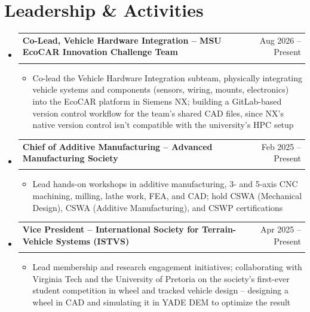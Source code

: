 \documentclass[a4paper,10pt]{article}
\makeatletter
\newcommand{\resumeItem}[1]{
  \item\small{#1 \vspace{-2pt}}
}
\newcommand{\resumeSubheading}[4]{
  \vspace{-2pt}\item
    \begin{tabular*}{0.99\textwidth}[t]{l@{\extracolsep{\fill}}r}
      \textbf{#1} & #2 \\
      \textit{\small#3} & \textit{\small #4} \\
    \end{tabular*}\vspace{-7pt}
}
\newcommand{\resumeSubHeadingListStart}{\begin{itemize}[leftmargin=0.0in, label={}]}
\newcommand{\resumeSubHeadingListEnd}{\end{itemize}}
\newcommand{\resumeItemListStart}{\begin{itemize}[leftmargin=0.15in, label=\textbullet]}
\newcommand{\resumeItemListEnd}{\end{itemize}\vspace{-5pt}}
\makeatother
\begin{document}
\section{Leadership \& Activities}
\resumeSubHeadingListStart
  \resumeSubheading
    {Co-Lead, Vehicle Hardware Integration -- MSU EcoCAR Innovation Challenge Team}{Aug 2026 -- Present}
    {}{}
    \resumeItemListStart
      \resumeItem{Co-lead the Vehicle Hardware Integration subteam, physically integrating vehicle systems and components (sensors, wiring, mounts, electronics) into the EcoCAR platform in Siemens NX; building a GitLab-based version control workflow for the team's shared CAD files, since NX's native version control isn't compatible with the university's HPC setup}
    \resumeItemListEnd
  \resumeSubheading
    {Chief of Additive Manufacturing -- Advanced Manufacturing Society}{Feb 2025 -- Present}
    {}{}
    \resumeItemListStart
      \resumeItem{Lead hands-on workshops in additive manufacturing, 3- and 5-axis CNC machining, milling, lathe work, FEA, and CAD; hold CSWA (Mechanical Design), CSWA (Additive Manufacturing), and CSWP certifications}
    \resumeItemListEnd
  \resumeSubheading
    {Vice President -- International Society for Terrain-Vehicle Systems (ISTVS)}{Apr 2025 -- Present}
    {}{}
    \resumeItemListStart
      \resumeItem{Lead membership and research engagement initiatives; collaborating with Virginia Tech and the University of Pretoria on the society's first-ever student competition in wheel and tracked vehicle design -- designing a wheel in CAD and simulating it in YADE DEM to optimize the result}
    \resumeItemListEnd
\resumeSubHeadingListEnd
\end{document}
